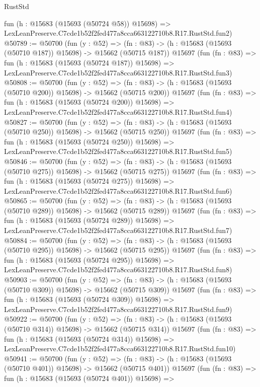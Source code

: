 \begin{lexlean}{RustStd}
\begin{coremodule}
    fun (h : @15683 (@15693 (@50724 @58)) @15698) =>
    LexLeanPreserve.C7cde1b52f2fed477a8cca663122710b8.R17.RustStd.fun2)
@50789 := @50700
    (fun (y : @52) =>
    (fn : @83) -> (h : @15683 (@15693 (@50710 @187)) @15698) -> @15662 (@50715 @187))
    @15697
    (fun (fn : @83) =>
    fun (h : @15683 (@15693 (@50724 @187)) @15698) =>
    LexLeanPreserve.C7cde1b52f2fed477a8cca663122710b8.R17.RustStd.fun3)
@50808 := @50700
    (fun (y : @52) =>
    (fn : @83) -> (h : @15683 (@15693 (@50710 @200)) @15698) -> @15662 (@50715 @200))
    @15697
    (fun (fn : @83) =>
    fun (h : @15683 (@15693 (@50724 @200)) @15698) =>
    LexLeanPreserve.C7cde1b52f2fed477a8cca663122710b8.R17.RustStd.fun4)
@50827 := @50700
    (fun (y : @52) =>
    (fn : @83) -> (h : @15683 (@15693 (@50710 @250)) @15698) -> @15662 (@50715 @250))
    @15697
    (fun (fn : @83) =>
    fun (h : @15683 (@15693 (@50724 @250)) @15698) =>
    LexLeanPreserve.C7cde1b52f2fed477a8cca663122710b8.R17.RustStd.fun5)
@50846 := @50700
    (fun (y : @52) =>
    (fn : @83) -> (h : @15683 (@15693 (@50710 @275)) @15698) -> @15662 (@50715 @275))
    @15697
    (fun (fn : @83) =>
    fun (h : @15683 (@15693 (@50724 @275)) @15698) =>
    LexLeanPreserve.C7cde1b52f2fed477a8cca663122710b8.R17.RustStd.fun6)
@50865 := @50700
    (fun (y : @52) =>
    (fn : @83) -> (h : @15683 (@15693 (@50710 @289)) @15698) -> @15662 (@50715 @289))
    @15697
    (fun (fn : @83) =>
    fun (h : @15683 (@15693 (@50724 @289)) @15698) =>
    LexLeanPreserve.C7cde1b52f2fed477a8cca663122710b8.R17.RustStd.fun7)
@50884 := @50700
    (fun (y : @52) =>
    (fn : @83) -> (h : @15683 (@15693 (@50710 @295)) @15698) -> @15662 (@50715 @295))
    @15697
    (fun (fn : @83) =>
    fun (h : @15683 (@15693 (@50724 @295)) @15698) =>
    LexLeanPreserve.C7cde1b52f2fed477a8cca663122710b8.R17.RustStd.fun8)
@50903 := @50700
    (fun (y : @52) =>
    (fn : @83) -> (h : @15683 (@15693 (@50710 @309)) @15698) -> @15662 (@50715 @309))
    @15697
    (fun (fn : @83) =>
    fun (h : @15683 (@15693 (@50724 @309)) @15698) =>
    LexLeanPreserve.C7cde1b52f2fed477a8cca663122710b8.R17.RustStd.fun9)
@50922 := @50700
    (fun (y : @52) =>
    (fn : @83) -> (h : @15683 (@15693 (@50710 @314)) @15698) -> @15662 (@50715 @314))
    @15697
    (fun (fn : @83) =>
    fun (h : @15683 (@15693 (@50724 @314)) @15698) =>
    LexLeanPreserve.C7cde1b52f2fed477a8cca663122710b8.R17.RustStd.fun10)
@50941 := @50700
    (fun (y : @52) =>
    (fn : @83) -> (h : @15683 (@15693 (@50710 @401)) @15698) -> @15662 (@50715 @401))
    @15697
    (fun (fn : @83) =>
    fun (h : @15683 (@15693 (@50724 @401)) @15698) =>

\end{coremodule}
\end{lexlean}
